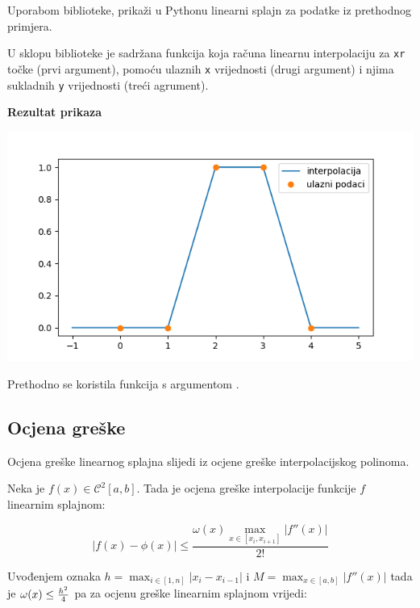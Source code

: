 \begin{example}
    Uporabom  biblioteke, prikaži u Pythonu linearni splajn
    za podatke iz prethodnog primjera.
\end{example}

U sklopu  biblioteke je sadržana  funkcija koja
računa linearnu interpolaciju za \verb|xr| točke (prvi argument), pomoću ulaznih
\verb|x| vrijednosti (drugi argument) i njima sukladnih \verb|y| vrijednosti
(treći agrument).

\begin{multicols}{2}
    

    \columnbreak

    \textbf{Rezultat prikaza}

    \includegraphics[width=\linewidth]{fig/lin_splajn.png}
\end{multicols}

Prethodno se koristila  funkcija s argumentom .

\newpage

\subsection{Ocjena greške}

Ocjena greške linearnog splajna slijedi iz ocjene greške interpolacijskog polinoma.

Neka je $f(x)\in\mathcal{C}^2[a,b]$. Tada je ocjena greške interpolacije funkcije $f$ linearnim splajnom:

$$
|f(x)-\phi(x)| \leq \frac{\omega(x)\max_{x\in[x_i,x_{i+1}]}|f''(x)|}{2!}
$$

Uvođenjem oznaka $h=\max_{i\in[1,n]}|x_i-x_{i-1}|$ i $M=\max_{x\in[a,b]}|f''(x)|$ tada je $\omega(x)\leq{h^2\over4}$ pa za ocjenu greške linearnim splajnom vrijedi:

